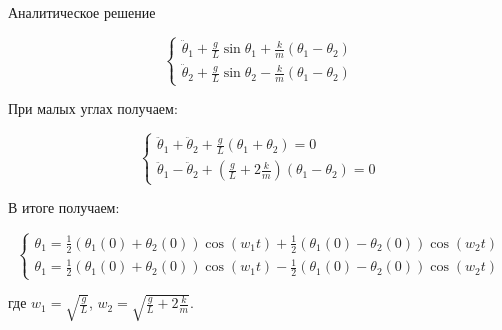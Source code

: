 \documentclass{beamer}
\begin{document}
\begin{frame}{Аналитическое решение}

    \begin{equation*}
        \begin{cases}
            \ddot \theta_1 + \frac{g}{L} \sin \theta_1 + \frac{k}{m} (\theta_1 - \theta_2)\\
            \ddot \theta_2 + \frac{g}{L} \sin \theta_2 - \frac{k}{m} (\theta_1 - \theta_2)
        \end{cases}
    \end{equation*}

    При малых углах получаем:

    \begin{equation*}
        \begin{cases}
            \ddot \theta_1 + \ddot \theta_2 + \frac{g}{L} (\theta_1 + \theta_2) = 0\\
            \ddot \theta_1 - \ddot \theta_2 + (\frac{g}{L} + 2 \frac{k}{m}) (\theta_1 - \theta_2) = 0
        \end{cases}
    \end{equation*}

    В итоге получаем:

    \begin{equation*}
        \begin{cases}
            \theta_1 = \frac{1}{2} (\theta_1(0) + \theta_2(0)) \cos (w_1 t) + \frac{1}{2} (\theta_1(0) - \theta_2(0)) \cos (w_2 t)\\
            \theta_1 = \frac{1}{2} (\theta_1(0) + \theta_2(0)) \cos (w_1 t) - \frac{1}{2} (\theta_1(0) - \theta_2(0)) \cos (w_2 t)
        \end{cases}
    \end{equation*}

    где $w_1 = \sqrt{\frac{g}{L}}$, $w_2 = \sqrt{\frac{g}{L} + 2 \frac{k}{m}}$.

\end{frame}

\end{document}
